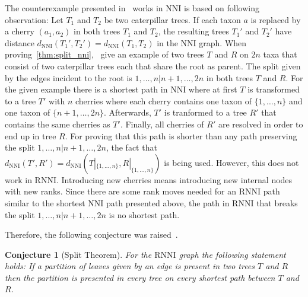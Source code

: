\documentclass[11pt, a4paper]{article}
\newcommand{\nni}{\mathrm{NNI}}
\newcommand{\rnni}{\mathrm{RNNI}}
\newtheorem{conjecture}[definition]{Conjecture}
\begin{document}
The counterexample presented in~\cite{Li1996} works in $\nni$ is based on following observation:
Let $T_1$ and $T_2$ be two caterpillar trees.
If each taxon $a$ is replaced by a cherry $(a_1,a_2)$ in both trees $T_1$ and $T_2$, the resulting trees $T_1'$ and $T_2'$ have distance $d_{\nni}(T_1',T_2') = d_{\nni}(T_1,T_2)$ in the $\nni$ graph.
When proving~\ref{thm:split_nni},~\cite{Li1996} give an example of two trees $T$ and $R$ on $2n$ taxa that consist of two caterpillar trees each that share the root as parent.
The split given by the edges incident to the root is $1, \ldots, n | n+1, \ldots, 2n$ in both trees $T$ and $R$.
For the given example there is a shortest path in $\nni$ where at first $T$ is transformed to a tree $T'$ with $n$ cherries where each cherry contains one taxon of $\{1, \ldots, n\}$ and one taxon of $\{n+1, \ldots, 2n\}$.
Afterwards, $T'$ is tranformed to a tree $R'$ that contains the same cherries as $T'$.
Finally, all cherries of $R'$ are resolved in order to end up in tree $R$.
For proving that this path is shorter than any path preserving the split $1, \ldots, n | n+1, \ldots, 2n$, the fact that $d_{\nni}(T',R') = d_{\nni}(T|_{\{1, \ldots, n\}}, R|_{\{1, \ldots, n\}})$ is being used.
However, this does not work in $\rnni$.
Introducing new cherries means introducing new internal nodes with new ranks.
Since there are some rank moves needed for an $\rnni$ path similar to the shortest $\nni$ path presented above, the path in $\rnni$ that breaks the split $1, \ldots, n | n+1, \ldots, 2n$ is no shortest path.


Therefore, the following conjecture was raised~\cite{Gavryushkin2017}.

\begin{conjecture}[Split Theorem]
	For the $\rnni$ graph the following statement holds:
	If a partition of leaves given by an edge is present in two trees $T$ and $R$ then the partition is presented in every tree on every shortest path between $T$ and $R$.
	\label{split_theorem}
\end{conjecture}
\end{document}
